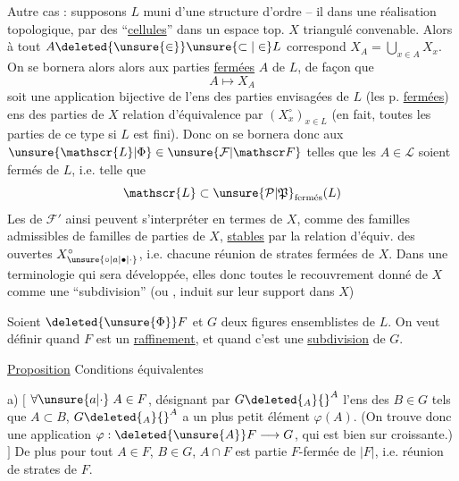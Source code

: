 Autre cas : supposons $L$ muni d'une structure d'ordre -- il  dans une réalisation topologique, par des ``\uline{cellules}''  dans un espace
top. $X$ triangulé convenable. Alors à tout $A\deleted{\unsure{\in}}\unsure{\subset|\in}L$ correspond  $X_A=\bigcup_{x\in A}X_x$.
On se bornera alors alors aux parties \uline{fermées} $A$ de $L$, de façon que
\[ A\longmapsto X_A \]
soit une application bijective de l'ens des parties envisagées de $L$ (les p. \uline{fermées})
 ens des parties  de $X$    relation d'équivalence  par  $(X_x^\circ)_{x\in L}$ (en fait, toutes les parties
de ce type si $L$ est fini). Donc on se bornera donc aux $\unsure{\mathscr{L}|\Phi}\in\unsure{\mathcal F|\mathscr F}$ telles que les $A\in\mathscr{L}$ soient fermés de $L$, i.e. telle que
\[ \mathscr{L}\subset\unsure{\mathcal P|\mathfrak P}_{\text{fermés}}(L) \]
Les  de $\mathcal F'$ ainsi  peuvent s'interpréter en termes de $X$, comme des familles admissibles  de familles de
parties  de $X$,  \uline{stables} par la relation d'équiv. des   ouvertes $X_{\unsure{\circ|a|\bullet|\cdot}}^\circ$, i.e. chacune réunion de strates fermées de $X$.
Dans une terminologie qui sera développée, elles  donc toutes le recouvrement donné de $X$ comme une ``subdivision''\unsure{;|,} (ou ,  induit sur leur support dans $X$)


Soient $\deleted{\unsure{\Phi}}F$ et $G$ deux figures ensemblistes de $L$. On veut définir quand $F$ est un \uline{raffinement}, et quand c'est une \uline{subdivision} de $G$.

\uline{Proposition} Conditions équivalentes

a) $[$ $\forall\unsure{a|\cdot}\;A\in F$, désignant par $G\deleted{{}_A}{}^A$ l'ens des $B\in G$ tels que $A\subset B$, $G\deleted{{}_A}{}^A$ a un plus petit
élément $\varphi(A)$. (On trouve donc une application $\varphi:\deleted{\unsure{A}}F\longrightarrow G$, qui est bien sur croissante.) $]$ De plus
pour tout $A\in F$, $B\in G$, $A\cap F$ est  partie $F$-fermée de $|F|$, i.e. réunion de strates de $F$.

